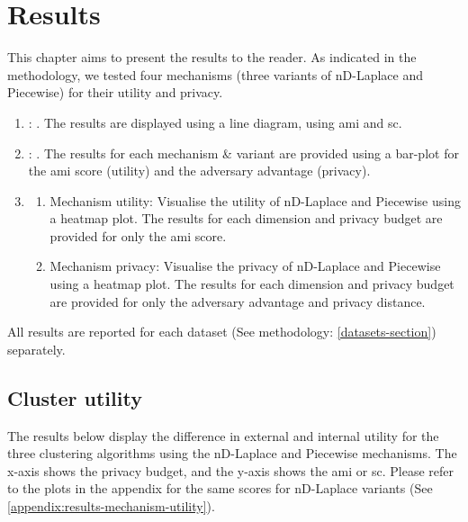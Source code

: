 \chapter{Results}
This chapter aims to present the results to the reader.
As indicated in the methodology, we tested four mechanisms (three variants of nD-Laplace and Piecewise) for their utility and privacy.
\begin{enumerate}
  \item {}: .
        The results are displayed using a line diagram, using \gls{ami} and \gls{sc}.
  \item {}: . The results for each mechanism \& variant are provided using a bar-plot for the \gls{ami} score (utility) and the adversary advantage (privacy).
  \item {} 
  \begin{enumerate}
    \item Mechanism utility: Visualise the utility of nD-Laplace and Piecewise using a heatmap plot.
        The results for each dimension and privacy budget are provided for only the \gls{ami} score.
    \item Mechanism privacy: Visualise the privacy of nD-Laplace and Piecewise using a heatmap plot.
        The results for each dimension and privacy budget are provided for only the adversary advantage and privacy distance.
  \end{enumerate}
\end{enumerate}
All results are reported for each dataset (See methodology: \ref{datasets-section}) separately.
\section{Cluster utility}
The results below display the difference in external and internal utility for the three clustering algorithms using the nD-Laplace and Piecewise mechanisms.
The x-axis shows the privacy budget, and the y-axis shows the \gls{ami} or \gls{sc}.
Please refer to the plots in the appendix for the same scores for nD-Laplace variants (See \ref{appendix:results-mechanism-utility}).
\newpage
